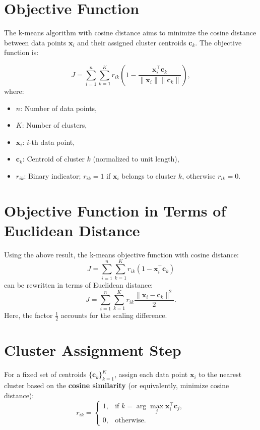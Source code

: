 \documentclass[12pt,twoside,a4paper,parskip]{scrbook} %
\begin{document}
\section*{Objective Function}

The k-means algorithm with cosine distance aims to minimize the cosine distance between data points \( \mathbf{x}_i \) and their assigned cluster centroids \( \mathbf{c}_k \). The objective function is:

\[
J = \sum_{i=1}^{n} \sum_{k=1}^{K} r_{ik} \left( 1 - \frac{\mathbf{x}_i^\top \mathbf{c}_k}{\|\mathbf{x}_i\| \|\mathbf{c}_k\|} \right),
\]
where:
\begin{itemize}
    \item \( n \): Number of data points,
    \item \( K \): Number of clusters,
    \item \( \mathbf{x}_i \): \( i \)-th data point,
    \item \( \mathbf{c}_k \): Centroid of cluster \( k \) (normalized to unit length),
    \item \( r_{ik} \): Binary indicator; \( r_{ik} = 1 \) if \( \mathbf{x}_i \) belongs to cluster \( k \), otherwise \( r_{ik} = 0 \).
\end{itemize}

\section*{Objective Function in Terms of Euclidean Distance}

Using the above result, the k-means objective function with cosine distance:
\[
J = \sum_{i=1}^{n} \sum_{k=1}^{K} r_{ik} \left( 1 - \mathbf{x}_i^\top \mathbf{c}_k \right)
\]
can be rewritten in terms of Euclidean distance:
\[
J = \sum_{i=1}^{n} \sum_{k=1}^{K} r_{ik} \frac{\|\mathbf{x}_i - \mathbf{c}_k\|^2}{2}.
\]
Here, the factor \( \frac{1}{2} \) accounts for the scaling difference.

\section*{Cluster Assignment Step}

For a fixed set of centroids \( \{ \mathbf{c}_k \}_{k=1}^K \), assign each data point \( \mathbf{x}_i \) to the nearest cluster based on the \textbf{cosine similarity} (or equivalently, minimize cosine distance):
\[
r_{ik} =
\begin{cases}
1, & \text{if } k = \arg\max_{j} \mathbf{x}_i^\top \mathbf{c}_j, \\
0, & \text{otherwise.}
\end{cases}
\]
\end{document}
